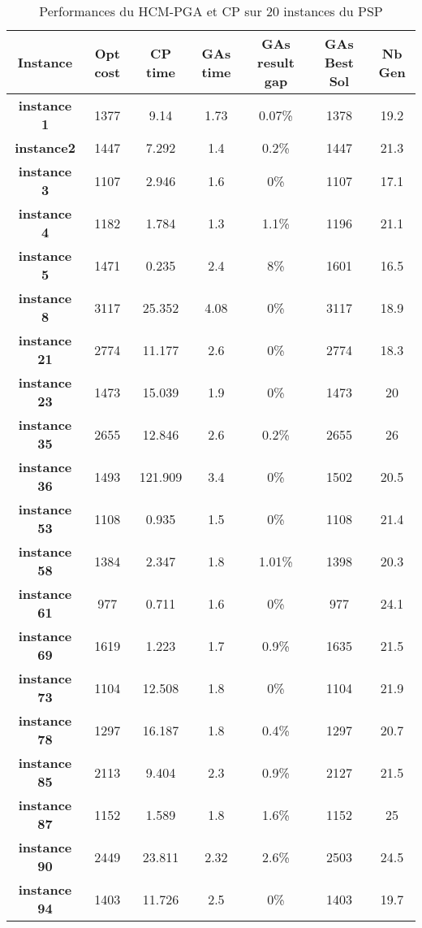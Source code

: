 		\begin{table}[h]
		\centering
		\begin{tabular}{|c|c|c|c|c|c|c|}
			\hline
			\textbf{Instance} & \textbf{Opt cost} & \textbf{CP time} & \textbf{GAs time} & \textbf{GAs result gap} & \textbf{GAs Best Sol} & \textbf{Nb Gen}\\
			\hline
			\textbf{instance 1} & 1377 & 9.14 & 1.73 & 0.07\% & 1378 & 19.2 \\
			\textbf{instance2} & 1447 & 7.292 & 1.4 & 0.2\% & 1447 & 21.3\\
			\textbf{instance 3} & 1107 & 2.946 & 1.6 & 0\% & 1107 & 17.1\\
			\textbf{instance 4} & 1182 & 1.784 & 1.3 & 1.1\% & 1196 & 21.1\\
			\textbf{instance 5} & 1471 & 0.235 & 2.4 & 8\% & 1601 & 16.5\\
			\textbf{instance 8} & 3117 & 25.352 & 4.08 & 0\% & 3117 & 18.9\\
			\textbf{instance 21} & 2774 & 11.177 & 2.6 & 0\% & 2774 & 18.3\\
			\textbf{instance 23} & 1473 & 15.039 & 1.9 & 0\% & 1473 & 20\\
			\textbf{instance 35} & 2655 & 12.846 & 2.6 & 0.2\% & 2655 & 26\\
			\textbf{instance 36} & 1493 & 121.909 & 3.4 & 0\% & 1502 & 20.5\\
			\textbf{instance 53} & 1108 & 0.935 & 1.5 & 0\% & 1108 & 21.4\\
			\textbf{instance 58} & 1384 & 2.347 & 1.8 & 1.01\% & 1398 & 20.3\\
			\textbf{instance 61} & 977 & 0.711 & 1.6 & 0\% & 977 & 24.1\\
			\textbf{instance 69} & 1619 & 1.223 & 1.7 & 0.9\% & 1635 & 21.5\\
			\textbf{instance 73} & 1104 & 12.508 & 1.8 & 0\% & 1104 & 21.9\\
			\textbf{instance 78} & 1297 & 16.187 & 1.8 & 0.4\% & 1297 & 20.7\\
			\textbf{instance 85} & 2113 & 9.404 & 2.3 & 0.9\% & 2127 & 21.5\\
			\textbf{instance 87} & 1152 & 1.589 & 1.8 & 1.6\% & 1152 & 25\\
			\textbf{instance 90} & 2449 & 23.811 & 2.32 & 2.6\% & 2503 & 24.5\\
			\textbf{instance 94} & 1403 & 11.726 & 2.5 & 0\% & 1403 & 19.7\\
			\hline
		\end{tabular}	
		\caption{Performances du HCM-PGA et CP sur 20 instances du PSP}	
		\label{tab:hcm_pga_cp}	
	\end{table}	
	
